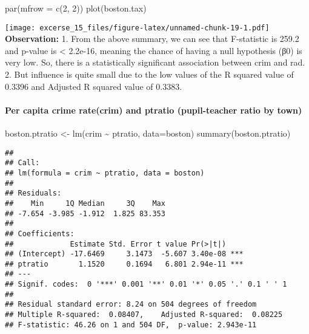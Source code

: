 \documentclass[
]{article}
\newenvironment{Shaded}{\begin{snugshade}}{\end{snugshade}}
\newcommand{\AttributeTok}[1]{\textcolor[rgb]{0.77,0.63,0.00}{#1}}
\newcommand{\DecValTok}[1]{\textcolor[rgb]{0.00,0.00,0.81}{#1}}
\newcommand{\FunctionTok}[1]{\textcolor[rgb]{0.00,0.00,0.00}{#1}}
\newcommand{\NormalTok}[1]{#1}
\newcommand{\OtherTok}[1]{\textcolor[rgb]{0.56,0.35,0.01}{#1}}
\newcommand{\SpecialCharTok}[1]{\textcolor[rgb]{0.00,0.00,0.00}{#1}}
\begin{document}
\begin{Shaded}
\begin{Highlighting}[]
\FunctionTok{par}\NormalTok{(}\AttributeTok{mfrow =} \FunctionTok{c}\NormalTok{(}\DecValTok{2}\NormalTok{, }\DecValTok{2}\NormalTok{))}
\FunctionTok{plot}\NormalTok{(boston.tax)}
\end{Highlighting}
\end{Shaded}

\texttt{[image: excerse\_15\_files/figure-latex/unnamed-chunk-19-1.pdf]}
\textbf{Observation:} 1. From the above summary, we can see that
F-statistic is 259.2 and p-value is \textless{} 2.2e-16, meaning the
chance of having a null hypothesis (β0) is very low. So, there is a
statistically significant association between crim and rad. 2. But
influence is quite small due to the low values of the R squared value of
0.3396 and Adjusted R squared value of 0.3383.

\hypertarget{per-capita-crime-ratecrim-and-ptratio-pupil-teacher-ratio-by-town}{%
\paragraph{Per capita crime rate(crim) and ptratio (pupil-teacher ratio
by
town)}\label{per-capita-crime-ratecrim-and-ptratio-pupil-teacher-ratio-by-town}}

\begin{Shaded}
\begin{Highlighting}[]
\NormalTok{boston.ptratio }\OtherTok{\textless{}{-}} \FunctionTok{lm}\NormalTok{(crim }\SpecialCharTok{\textasciitilde{}}\NormalTok{ ptratio, }\AttributeTok{data=}\NormalTok{boston)}
\FunctionTok{summary}\NormalTok{(boston.ptratio)}
\end{Highlighting}
\end{Shaded}

\begin{verbatim}
## 
## Call:
## lm(formula = crim ~ ptratio, data = boston)
## 
## Residuals:
##    Min     1Q Median     3Q    Max 
## -7.654 -3.985 -1.912  1.825 83.353 
## 
## Coefficients:
##             Estimate Std. Error t value Pr(>|t|)    
## (Intercept) -17.6469     3.1473  -5.607 3.40e-08 ***
## ptratio       1.1520     0.1694   6.801 2.94e-11 ***
## ---
## Signif. codes:  0 '***' 0.001 '**' 0.01 '*' 0.05 '.' 0.1 ' ' 1
## 
## Residual standard error: 8.24 on 504 degrees of freedom
## Multiple R-squared:  0.08407,    Adjusted R-squared:  0.08225 
## F-statistic: 46.26 on 1 and 504 DF,  p-value: 2.943e-11
\end{verbatim}
\end{document}
